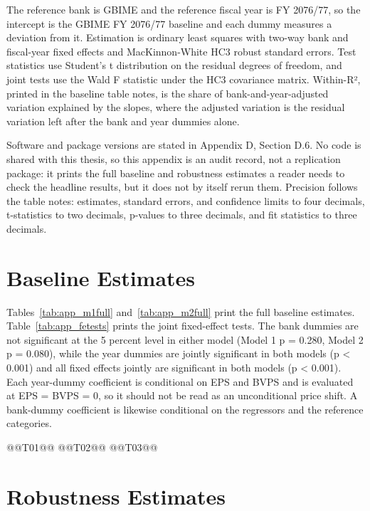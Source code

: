 The reference bank is GBIME and the reference fiscal year is FY 2076/77, so the intercept is the GBIME FY 2076/77 baseline and each dummy measures a deviation from it. Estimation is ordinary least squares with two-way bank and fiscal-year fixed effects and MacKinnon-White HC3 robust standard errors. Test statistics use Student's t distribution on the residual degrees of freedom, and joint tests use the Wald F statistic under the HC3 covariance matrix. Within-R², printed in the baseline table notes, is the share of bank-and-year-adjusted variation explained by the slopes, where the adjusted variation is the residual variation left after the bank and year dummies alone.

Software and package versions are stated in Appendix D, Section D.6. No code is shared with this thesis, so this appendix is an audit record, not a replication package: it prints the full baseline and robustness estimates a reader needs to check the headline results, but it does not by itself rerun them. Precision follows the table notes: estimates, standard errors, and confidence limits to four decimals, t-statistics to two decimals, p-values to three decimals, and fit statistics to three decimals.

\section{Baseline Estimates}

Tables~\ref{tab:app_m1full} and~\ref{tab:app_m2full} print the full baseline estimates. Table~\ref{tab:app_fetests} prints the joint fixed-effect tests. The bank dummies are not significant at the 5 percent level in either model (Model 1 p = 0.280, Model 2 p = 0.080), while the year dummies are jointly significant in both models (p < 0.001) and all fixed effects jointly are significant in both models (p < 0.001). Each year-dummy coefficient is conditional on EPS and BVPS and is evaluated at EPS = BVPS = 0, so it should not be read as an unconditional price shift. A bank-dummy coefficient is likewise conditional on the regressors and the reference categories.

@@T01@@
@@T02@@
@@T03@@

\section{Robustness Estimates}

